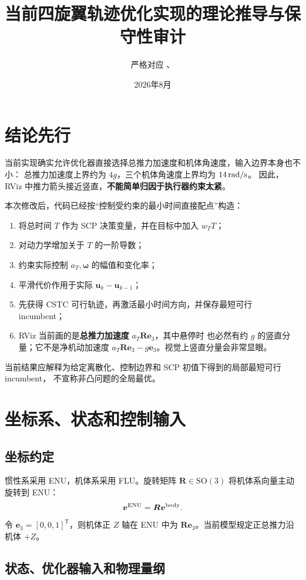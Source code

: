 \documentclass[UTF8,a4paper,11pt]{ctexart}
\title{当前四旋翼轨迹优化实现的理论推导与保守性审计}
\author{严格对应 \code{gpttraj.cpp/.h}、\code{gptmpc.cpp/.h}}
\date{2026年8月}
\newcommand{\SO}{\mathrm{SO}(3)}
\begin{document}
\maketitle
\tableofcontents

\section{结论先行}

当前实现确实允许优化器直接选择总推力加速度和机体角速度，输入边界本身也不小：
总推力加速度上界约为 $4g$，三个机体角速度上界均为 $14\,{\rm rad/s}$。
因此，RViz 中推力箭头接近竖直，\textbf{不能简单归因于执行器约束太紧}。

本次修改后，代码已经按“控制受约束的最小时间直接配点”构造：
\begin{enumerate}
  \item 将总时间 $T$ 作为 SCP 决策变量，并在目标中加入 $w_TT$；
  \item 对动力学增加关于 $T$ 的一阶导数；
  \item 约束实际控制 $a_T,\bm\omega$ 的幅值和变化率；
  \item 平滑代价作用于实际 $\bm u_k-\bm u_{k-1}$；
  \item 先获得 CSTC 可行轨迹，再激活最小时间方向，并保存最短可行 incumbent；
  \item RViz 当前画的是\textbf{总推力加速度} $a_T\bm R\bm e_3$，其中悬停时
  也必然有约 $g$ 的竖直分量；它不是净机动加速度
  $a_T\bm R\bm e_3-g\bm e_3$。视觉上竖直分量会非常显眼。
\end{enumerate}

当前结果应解释为给定离散化、控制边界和 SCP 初值下得到的局部最短可行 incumbent，
不宣称非凸问题的全局最优。

\section{坐标系、状态和控制输入}

\subsection{坐标约定}

惯性系采用 ENU，机体系采用 FLU。旋转矩阵
$\bm R\in\SO$ 将机体系向量主动旋转到 ENU：
\[
 \bm v^{\rm ENU}=\bm R\bm v^{\rm body}.
\]
令 $\bm e_3=[0,0,1]^\mathsf T$，则机体正 $Z$ 轴在 ENU 中为
$\bm R\bm e_3$。当前模型规定正总推力沿机体 $+Z$。

\subsection{状态、优化器输入和物理量纲}
\end{document}
